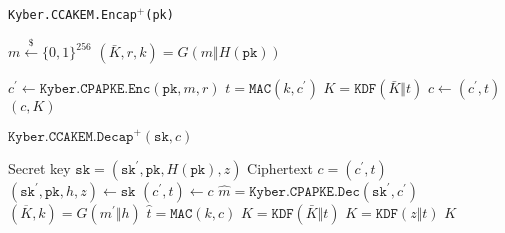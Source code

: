 \documentclass[floatrow,journal=tches,submission]{iacrtrans}
\newcommand{\mac}{\texttt{MAC}}
\newcommand{\pk}{\texttt{pk}}
\newcommand{\sk}{\texttt{sk}}
\newcommand{\leftsample}{\stackrel{\$}{\leftarrow}}
\begin{document}
\begin{algorithm}[H]
    \caption{\texttt{Kyber.CCAKEM.Encap$^+$(\pk)}}\label{alg:kyber-ae-encap}
    \begin{algorithmic}[1]
        \State $m \leftsample \{0,1\}^{256}$
        \State $(\bar{K}, r, k) = G(m \Vert H(\pk))$
 
        \State $c^\prime  \leftarrow \texttt{Kyber.CPAPKE.Enc}(\pk, m, r)$
            \State $t=\mac(k, c^\prime)$
        \State $K = \texttt{KDF}(\bar{K} \Vert t)$
        \State $c \leftarrow (c^\prime, t)$
        \State \Return $(c, K)$
    \end{algorithmic}
\end{algorithm}

\begin{algorithm}[H]
    \caption{$\texttt{Kyber.CCAKEM.Decap}^+ (\sk, c)$}\label{alg:kyber-ae-decap}
    \begin{algorithmic}[1]
        \Require Secret key $\sk = (\sk^\prime, \pk, H(\pk), z)$
        \Require Ciphertext $c = (c^\prime, t)$
        \State $(\sk^\prime, \pk, h, z) \leftarrow \sk$
        \State $(c^\prime, t) \leftarrow c$
        \State $\hat{m} = \texttt{Kyber.CPAPKE.Dec}(\sk^\prime, c^\prime)$ 
        \State $(\overline{K}, k) =   G(m^\prime \Vert h)$
        \State $\hat{t}=\mac(k, c)$
            \State $K  = \texttt{KDF}(\bar{K} \Vert t)$ 
         \Else 
            \State $K  = \texttt{KDF}(z \Vert t)$ 
        \EndIf
            \State \Return $K$
    \end{algorithmic}
\end{algorithm}
\end{document}
